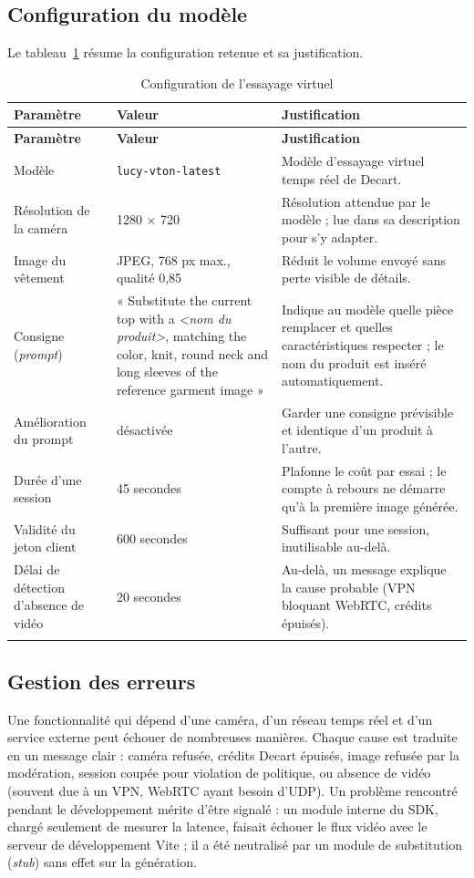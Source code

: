 \subsection{Configuration du modèle}
Le tableau~\ref{tab:config-tryon} résume la configuration retenue et sa justification.
\renewcommand{\arraystretch}{1.3}
\begin{longtable}{|p{4.2cm}|p{3.6cm}|p{6.6cm}|}
\hline
\textbf{Paramètre} & \textbf{Valeur} & \textbf{Justification} \\
\hline
\endfirsthead
\hline
\textbf{Paramètre} & \textbf{Valeur} & \textbf{Justification} \\
\hline
\endhead
Modèle & \texttt{lucy-vton-latest} & Modèle d'essayage virtuel temps réel de Decart. \\
\hline
Résolution de la caméra & 1280 × 720 & Résolution attendue par le modèle ; lue dans sa description pour s'y adapter. \\
\hline
Image du vêtement & JPEG, 768 px max., qualité 0,85 & Réduit le volume envoyé sans perte visible de détails. \\
\hline
Consigne (\textit{prompt}) & « Substitute the current top with a \textit{<nom du produit>}, matching the color, knit, round neck and long sleeves of the reference garment image » & Indique au modèle quelle pièce remplacer et quelles caractéristiques respecter ; le nom du produit est inséré automatiquement. \\
\hline
Amélioration du prompt & désactivée & Garder une consigne prévisible et identique d'un produit à l'autre. \\
\hline
Durée d'une session & 45 secondes & Plafonne le coût par essai ; le compte à rebours ne démarre qu'à la première image générée. \\
\hline
Validité du jeton client & 600 secondes & Suffisant pour une session, inutilisable au-delà. \\
\hline
Délai de détection d'absence de vidéo & 20 secondes & Au-delà, un message explique la cause probable (VPN bloquant WebRTC, crédits épuisés). \\
\hline
\caption{Configuration de l'essayage virtuel}
\label{tab:config-tryon}
\end{longtable}

\subsection{Gestion des erreurs}
Une fonctionnalité qui dépend d'une caméra, d'un réseau temps réel et d'un service externe peut échouer de nombreuses manières. Chaque cause est traduite en un message clair : caméra refusée, crédits Decart épuisés, image refusée par la modération, session coupée pour violation de politique, ou absence de vidéo (souvent due à un VPN, WebRTC ayant besoin d'UDP). Un problème rencontré pendant le développement mérite d'être signalé : un module interne du SDK, chargé seulement de mesurer la latence, faisait échouer le flux vidéo avec le serveur de développement Vite ; il a été neutralisé par un module de substitution (\textit{stub}) sans effet sur la génération.

